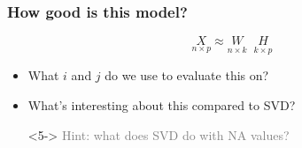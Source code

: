 \documentclass[xcolor={dvipsnames}]{beamer}
\begin{document}
\frame
{
\frametitle{How good is this model?}

\vspace{-1.75em} 
\LARGE $$\;\underset{n\times p}{X} \approx{} \underset{n\times k}{W}\;\;\underset{k\times p}{H}$$



\normalsize 

\begin{itemize}
\item<3-> What $i$ and $j$ do we use to evaluate this on? 
\end{itemize}




\begin{itemize}
\item<4-> What's interesting about this compared to SVD?\\
\item[]<5-> \textcolor{gray}{Hint: what does SVD do with NA values?}
\end{itemize}

}
\end{document}

